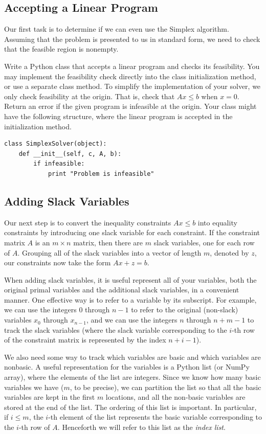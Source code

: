 \subsection{Accepting a Linear Program}
Our first task is to determine if we can even use the Simplex algorithm.
Assuming that the problem is presented to us in standard form, we need
to check that the feasible region is nonempty.

\begin{problem}
Write a Python class that accepts a linear program and checks its feasibility.
You may implement the feasibility check directly into the class initialization method, or use a separate class method.
To simplify the implementation of your solver, we only check feasibility at the origin.
That is, check that $Ax \leq b$ when $x = 0$.
Return an error if the given program is infeasible at the origin.
Your class might have the following structure, where the linear program is accepted in the initialization method.
\begin{lstlisting}
class SimplexSolver(object):
    def __init__(self, c, A, b):
        if infeasible:
            print "Problem is infeasible"
\end{lstlisting}
\label{prob:initsolver}
\end{problem}

\subsection{Adding Slack Variables}
Our next step is to convert the inequality constraints $Ax \leq b$ into equality constraints
by introducing one slack variable for each constraint. 
If the constraint matrix $A$ is an $m \times n$ matrix, then there are $m$ slack variables,
one for each row of $A$.
Grouping all of the slack variables into a vector of length $m$, denoted by $z$, our
constraints now take the form $Ax + z = b$.

When adding slack variables, it is useful represent all of your variables, both the original primal variables and
the additional slack variables, in a convenient manner.
One effective way is to refer to a variable by its subscript.
For example, we can use the integers $0$ through $n-1$ to refer to the original (non-slack) variables $x_0$ through
$x_{n-1}$, and we can use the integers $n$ through $n+m-1$ to track the slack variables (where the slack variable
corresponding to the $i$-th row of the constraint matrix is represented by the index $n+i-1$).

We also need some way to track which variables are basic and which variables are nonbasic.
A useful representation for the variables is a Python list (or NumPy array), where the elements of the list are integers.
Since we know how many basic variables we have ($m$, to be precise), we can partition the list so that all the basic
variables are kept in the first $m$ locations, and all the non-basic variables are stored at the end of the list.
The ordering of this list is important. In particular, if $i \leq m$, the $i$-th element of the list represents
the basic variable corresponding to the $i$-th row of $A$. Henceforth we will refer to this list as the \emph{index list}.

